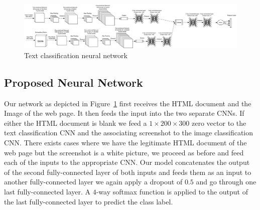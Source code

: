 \documentclass{article} %
\begin{document}
\begin{figure}
\centering
        \includegraphics[totalheight=3cm]{Combined}
    \caption{Text classification neural network}
    \label{fig:CNN}
\end{figure}

\subsection{Proposed Neural Network}
  \label{ProposedNet}

Our network as depicted in Figure~\ref{fig:CNN} first receives the HTML document and the Image of the web page. It then feeds the input into the two separate CNNs. If either the HTML document is blank we feed a $1\times200\times300$ zero vector to the text classification CNN and the associating screenshot to the image classification CNN. There exists cases where we have the legitimate HTML document of the web page but the screenshot is a white picture, we proceed as before and feed each of the inputs to the appropriate CNN. Our model concatenates the output of the second fully-connected layer of both inputs and feeds
them as an input to another fully-connected layer we again apply a dropout of $0.5$ and go through one last fully-connected layer. A $4$-way softmax function is applied to the output of the last fully-connected layer to predict the class label.
\end{document}
